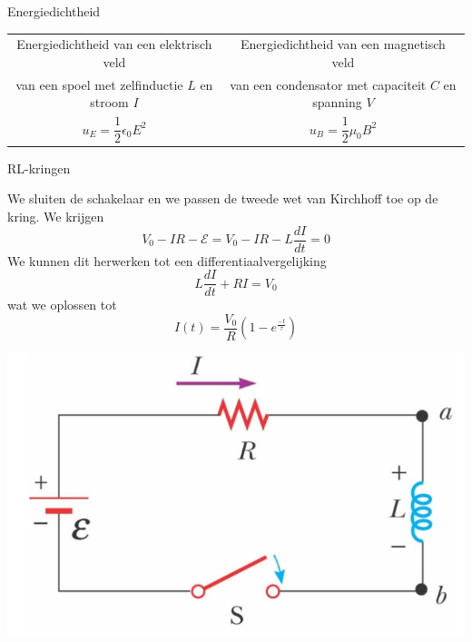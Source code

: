 \begin{vrg}[Energiedichtheid]{Energiedichtheid}   
    \vspace{-0.3cm}
    \def\arraystretch{2}
    \centering
    \begin{tabular}{c|c}
        Energiedichtheid van een elektrisch veld & Energiedichtheid van een magnetisch veld \\[-0.35cm]
        van een spoel met zelfinductie $L$ en stroom $I$ & van een condensator met capaciteit $C$ en spanning $V$ \\ \hline
        $u_{E} = \dfrac{1}{2}\epsilon_{0}E^{2}$ & $u_{B} = \dfrac{1}{2}\mu_{0}B^{2}$ \\
    \end{tabular}
\end{vrg}

\begin{app}[RL-kringen]{RL-kringen}
    \vspace{-0.5cm}
    \begin{minipage}{.66\textwidth}
        We sluiten de schakelaar en we passen de tweede wet van Kirchhoff toe op de kring. We krijgen
        \begin{equation*}
            V_{0} - IR - \mathcal{E} = V_{0} - IR - L\dfrac{dI}{dt} = 0
        \end{equation*}
        We kunnen dit herwerken tot een differentiaalvergelijking
        \begin{equation*}
            L\dfrac{dI}{dt} + RI = V_{0}
        \end{equation*}
        wat we oplossen tot 
        \begin{equation*}
            I(t) = \dfrac{V_{0}}{R}\left(1 - e^{\tfrac{-t}{\tau}}\right)
        \end{equation*} 
    \end{minipage}
    \begin{minipage}{.3\textwidth}
        \hspace{0.5cm}\includegraphics[scale = 0.35]{Images/Magnetisme/RLKring}

\end{minipage}
\end{app}
